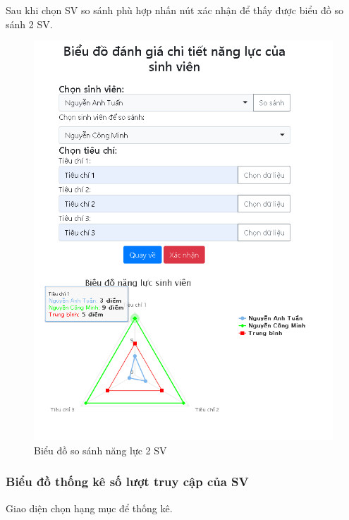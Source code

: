 \newpage 
Sau khi chọn SV so sánh phù hợp nhấn nút xác nhận để thấy được biểu đồ so sánh 2 SV.
\begin{center}
	\begin{figure}[htp]
		\begin{center}
			\includegraphics[width=0.8\linewidth]{img/25}
		\end{center}
		\caption{Biểu đồ so sánh năng lực 2 SV}
		\label{refhinh57}
	\end{figure}
\end{center}


\newpage
\subsubsection{Biểu đồ thống kê số lượt truy cập của SV}

Giao diện chọn hạng mục để thống kê.

